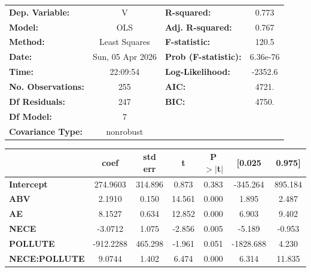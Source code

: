 \begin{center}
\begin{tabular}{lclc}
\toprule
\textbf{Dep. Variable:}    &        V         & \textbf{  R-squared:         } &     0.773   \\
\textbf{Model:}            &       OLS        & \textbf{  Adj. R-squared:    } &     0.767   \\
\textbf{Method:}           &  Least Squares   & \textbf{  F-statistic:       } &     120.5   \\
\textbf{Date:}             & Sun, 05 Apr 2026 & \textbf{  Prob (F-statistic):} &  6.36e-76   \\
\textbf{Time:}             &     22:09:54     & \textbf{  Log-Likelihood:    } &   -2352.6   \\
\textbf{No. Observations:} &         255      & \textbf{  AIC:               } &     4721.   \\
\textbf{Df Residuals:}     &         247      & \textbf{  BIC:               } &     4750.   \\
\textbf{Df Model:}         &           7      & \textbf{                     } &             \\
\textbf{Covariance Type:}  &    nonrobust     & \textbf{                     } &             \\
\bottomrule
\end{tabular}
\begin{tabular}{lcccccc}
                      & \textbf{coef} & \textbf{std err} & \textbf{t} & \textbf{P$> |$t$|$} & \textbf{[0.025} & \textbf{0.975]}  \\
\midrule
\textbf{Intercept}    &     274.9603  &      314.896     &     0.873  &         0.383        &     -345.264    &      895.184     \\
\textbf{ABV}          &       2.1910  &        0.150     &    14.561  &         0.000        &        1.895    &        2.487     \\
\textbf{AE}           &       8.1527  &        0.634     &    12.852  &         0.000        &        6.903    &        9.402     \\
\textbf{NECE}         &      -3.0712  &        1.075     &    -2.856  &         0.005        &       -5.189    &       -0.953     \\
\textbf{POLLUTE}      &    -912.2288  &      465.298     &    -1.961  &         0.051        &    -1828.688    &        4.230     \\
\textbf{NECE:POLLUTE} &       9.0744  &        1.402     &     6.474  &         0.000        &        6.314    &       11.835     \\

\end{tabular}
\end{center}
